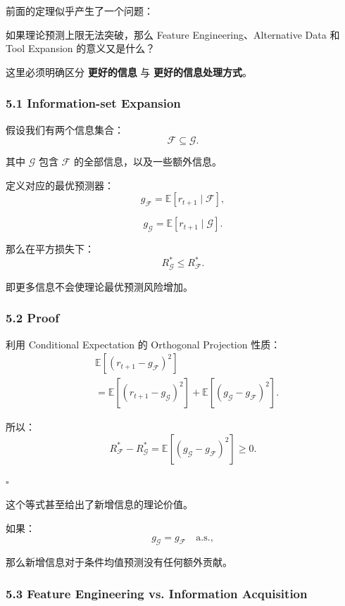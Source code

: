 前面的定理似乎产生了一个问题：

如果理论预测上限无法突破，那么 Feature Engineering、Alternative Data 和 Tool Expansion 的意义又是什么？

这里必须明确区分 \textbf{更好的信息} 与 \textbf{更好的信息处理方式}。

\hypertarget{part-4-60-0001-information-set-expansion}{%
\subsubsection{5.1 Information-set Expansion}\label{part-4-60-0001-information-set-expansion}}

假设我们有两个信息集合：
\[\mathcal F\subseteq\mathcal G.\]

其中 \(\mathcal G\) 包含 \(\mathcal F\) 的全部信息，以及一些额外信息。

定义对应的最优预测器：
\[g_{\mathcal F}
=
\mathbb E[r_{t+1}\mid\mathcal F],\]

\[g_{\mathcal G}
=
\mathbb E[r_{t+1}\mid\mathcal G].\]

那么在平方损失下：
\[\boxed{
R^*_{\mathcal G}
\leq R^*_{\mathcal F}.
}\]

即更多信息不会使理论最优预测风险增加。

\hypertarget{part-4-60-0001-proof-1}{%
\subsubsection{5.2 Proof}\label{part-4-60-0001-proof-1}}

利用 Conditional Expectation 的 Orthogonal Projection 性质：
\[\begin{aligned}
&\mathbb E[(r_{t+1}-g_{\mathcal F})^2]\\
&=
\mathbb E[(r_{t+1}-g_{\mathcal G})^2]
+
\mathbb E[(g_{\mathcal G}-g_{\mathcal F})^2].
\end{aligned}\]

所以：
\[\boxed{
R^*_{\mathcal F}-R^*_{\mathcal G}
=
\mathbb E[(g_{\mathcal G}-g_{\mathcal F})^2]
\geq0.
}\]

\(\square\)

这个等式甚至给出了新增信息的理论价值。

如果：
\[g_{\mathcal G}=g_{\mathcal F}\quad\text{a.s.},\]

那么新增信息对于条件均值预测没有任何额外贡献。

\hypertarget{part-4-60-0001-feature-engineering-vs.-information-acquisition}{%
\subsubsection{5.3 Feature Engineering vs. Information Acquisition}\label{part-4-60-0001-feature-engineering-vs.-information-acquisition}}

